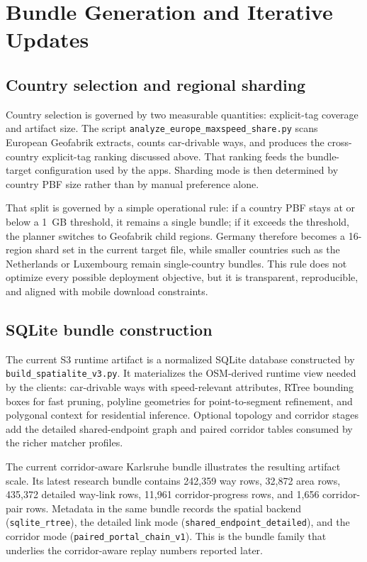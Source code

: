 \documentclass{article}
\begin{document}
\section{Bundle Generation and Iterative Updates}
\subsection{Country selection and regional sharding}
Country selection is governed by two measurable quantities: explicit-tag coverage and artifact size. The script \texttt{analyze\_europe\_maxspeed\_share.py} scans European Geofabrik extracts, counts car-drivable ways, and produces the cross-country explicit-tag ranking discussed above. That ranking feeds the bundle-target configuration used by the apps. Sharding mode is then determined by country PBF size rather than by manual preference alone.

That split is governed by a simple operational rule: if a country PBF stays at or below a \SI{1}{GB} threshold, it remains a single bundle; if it exceeds the threshold, the planner switches to Geofabrik child regions. Germany therefore becomes a 16-region shard set in the current target file, while smaller countries such as the Netherlands or Luxembourg remain single-country bundles. This rule does not optimize every possible deployment objective, but it is transparent, reproducible, and aligned with mobile download constraints.

\subsection{SQLite bundle construction}
The current S3 runtime artifact is a normalized SQLite database constructed by \texttt{build\_spatialite\_v3.py}. It materializes the OSM-derived runtime view needed by the clients: car-drivable ways with speed-relevant attributes, RTree bounding boxes for fast pruning, polyline geometries for point-to-segment refinement, and polygonal context for residential inference. Optional topology and corridor stages add the detailed shared-endpoint graph and paired corridor tables consumed by the richer matcher profiles.

The current corridor-aware Karlsruhe bundle illustrates the resulting artifact scale. Its latest research bundle contains 242{,}359 way rows, 32{,}872 area rows, 435{,}372 detailed way-link rows, 11{,}961 corridor-progress rows, and 1{,}656 corridor-pair rows. Metadata in the same bundle records the spatial backend (\texttt{sqlite\_rtree}), the detailed link mode (\texttt{shared\_endpoint\_detailed}), and the corridor mode (\texttt{paired\_portal\_chain\_v1}). This is the bundle family that underlies the corridor-aware replay numbers reported later.
\end{document}
